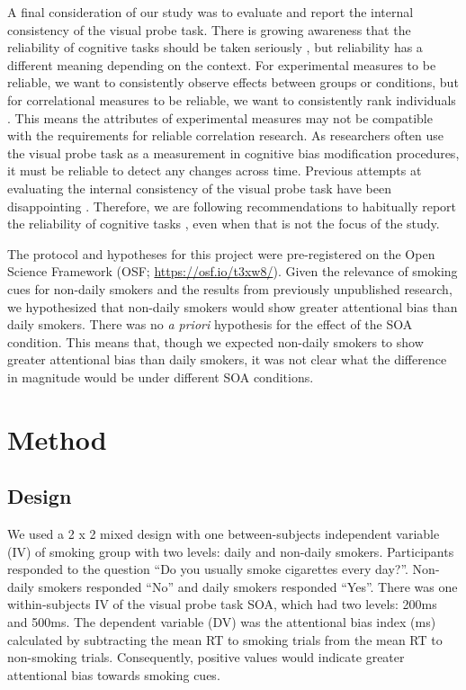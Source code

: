 \documentclass[empirical, authordate]{jote-new-article}
\begin{document}
A final consideration of our study was to evaluate and report the internal consistency of the visual probe task. There is growing awareness that the reliability of cognitive tasks should be taken seriously \parencite{Parsons2019, Pennington2021}, but reliability has a different meaning depending on the context. For experimental measures to be reliable, we want to consistently observe effects between groups or conditions, but for correlational measures to be reliable, we want to consistently rank individuals \parencite{Hedge2018}. This means the attributes of experimental measures may not be compatible with the requirements for reliable correlation research. As researchers often use the visual probe task as a measurement in cognitive bias modification procedures, it must be reliable to detect any changes across time. Previous attempts at evaluating the internal consistency of the visual probe task have been disappointing \parencite{Ataya2012, Schmukle2005, Waechter2014}. Therefore, we are following recommendations to habitually report the reliability of cognitive tasks \parencite{Parsons2019}, even when that is not the focus of the study.

The protocol and hypotheses for this project were pre-registered on the Open Science Framework (OSF; \url{https://osf.io/t3xw8/}). Given the relevance of smoking cues for non-daily smokers and the results from previously unpublished research, we hypothesized that non-daily smokers would show greater attentional bias than daily smokers. There was no \emph{a priori} hypothesis for the effect of the SOA condition. This means that, though we expected non-daily smokers to show greater attentional bias than daily smokers, it was not clear what the difference in magnitude would be under different SOA conditions.

\section{Method}

\subsection{Design}

We used a 2 x 2 mixed design with one between-subjects independent variable (IV) of smoking group with two levels: daily and non-daily smokers. Participants responded to the question “Do you usually smoke cigarettes every day?”. Non-daily smokers responded “No” and daily smokers responded “Yes”. There was one within-subjects IV of the visual probe task SOA, which had two levels: 200ms and 500ms. The dependent variable (DV) was the attentional bias index (ms) calculated by subtracting the mean RT to smoking trials from the mean RT to non-smoking trials. Consequently, positive values would indicate greater attentional bias towards smoking cues.
\end{document}
